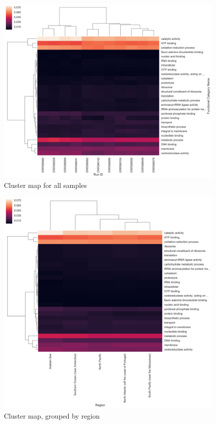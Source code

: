 \documentclass[12pt,a4paper,]{article}
\begin{document}
\begin{figure}
\centering
\includegraphics{imgs/cluster/cluster_all.png}
\caption{Cluster map for all samples\label{fig:cluster_all}}
\end{figure}

\begin{figure}
\centering
\includegraphics{imgs/cluster/cluster_region.png}
\caption{Cluster map, grouped by region\label{fig:cluster_region}}
\end{figure}
\end{document}
